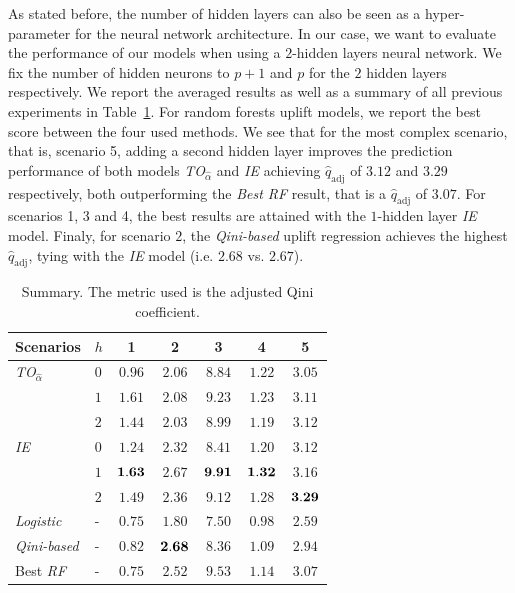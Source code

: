 \documentclass{article}
\def\qadj{\hat{q}_{\mathrm{adj}}}
\begin{document}
As stated before, the number of hidden layers can also be seen as a hyper-parameter for the neural network architecture. In our case, we want to evaluate the performance of our models when using a $2$-hidden layers neural network. We fix the number of hidden neurons to $p+1$ and $p$ for the $2$ hidden layers respectively. We report the averaged results as well as a summary of all previous experiments in Table~\ref{tab:hidden_layers_results}. For random forests uplift models, we report the best score between the four used methods. We see that for the most complex scenario, that is, scenario 5, adding a second hidden layer improves the prediction performance of both models {\it TO$_{\hat\alpha}$} and {\it IE} achieving $\qadj$ of $3.12$ and $3.29$ respectively, both outperforming the {\it Best RF} result, that is a $\qadj$ of $3.07$. For scenarios 1, 3 and 4, the best results are attained with the $1$-hidden layer {\it IE} model. Finaly, for scenario $2$, the {\it Qini-based} uplift regression achieves the highest $\qadj$, tying with the {\it IE} model (i.e. $2.68$ vs. $2.67$).   

\begin{table}[!ht]
    \centering
    \caption{Summary. The metric used is the adjusted Qini coefficient.}
    \label{tab:hidden_layers_results}
    \begin{tabular}{l|l|ccccc}
        Scenarios &$h$ & 1 & 2 & 3 & 4 & 5\\
        \hline
        {\it TO$_{\hat\alpha}$}& $0$ & $0.96$  & $2.06$ & $8.84$ & $1.22$ & $3.05$\\
        & $1$ & $1.61$ & $2.08$ & $9.23$ &  $1.23$ & $3.11$ \\
        & $2$ & $1.44$ & $2.03$ & $8.99$ & $1.19$ & $3.12$ \\
        \hline
        {\it IE} & $0$ & $1.24$  & $2.32$ & $8.41$ & $1.20$ & $3.12$\\
        & $1$ & $\bf 1.63$ & $2.67$  & $\bf 9.91$ & $\bf 1.32$ & $3.16$\\
        & $2$ & $1.49$ & $2.36$ & $9.12$ & $1.28$ & $\bf 3.29$ \\
        \hline
        {\it Logistic} & - & $0.75$ & $1.80$  & $7.50$ & $0.98$ & $2.59$\\
        {\it Qini-based} & - & $0.82$ & $\bf 2.68$ & $8.36$ & $1.09$ & $2.94$\\
        Best {\it RF} & - & $0.75$ & $2.52$ & $9.53$ & $ 1.14$ & $3.07$\\
        \hline
    \end{tabular}
\end{table}
\end{document}
